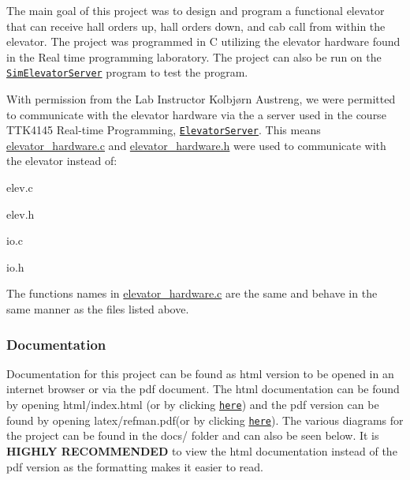 The main goal of this project was to design and program a functional elevator that can receive hall orders up, hall orders down, and cab call from within the elevator. The project was programmed in C utilizing the elevator hardware found in the Real time programming laboratory. The project can also be run on the \href{https://github.com/TTK4145/Simulator-v2}{\tt {\ttfamily Sim\+Elevator\+Server}} program to test the program.

With permission from the Lab Instructor Kolbjørn Austreng, we were permitted to communicate with the elevator hardware via the a server used in the course T\+T\+K4145 Real-\/time Programming, \href{https://github.com/TTK4145/elevator-server}{\tt {\ttfamily Elevator\+Server}}. This means {\ttfamily \hyperlink{elevator__hardware_8c}{elevator\+\_\+hardware.\+c}} and {\ttfamily \hyperlink{elevator__hardware_8h}{elevator\+\_\+hardware.\+h}} were used to communicate with the elevator instead of\+:


\begin{DoxyItemize}
\item {\ttfamily elev.\+c}
\item {\ttfamily elev.\+h}
\item {\ttfamily io.\+c}
\item {\ttfamily io.\+h}
\end{DoxyItemize}

The functions names in {\ttfamily \hyperlink{elevator__hardware_8c}{elevator\+\_\+hardware.\+c}} are the same and behave in the same manner as the files listed above. 



\subsubsection*{Documentation}

Documentation for this project can be found as html version to be opened in an internet browser or via the pdf document. The html documentation can be found by opening {\ttfamily html/index.\+html} (or by clicking \href{html/index.html}{\tt here}) and the {\ttfamily pdf} version can be found by opening {\ttfamily latex/refman.\+pdf}(or by clicking \href{latex/refman.pdf}{\tt here}). The various diagrams for the project can be found in the {\ttfamily docs/} folder and can also be seen below. It is {\bfseries H\+I\+G\+H\+LY R\+E\+C\+O\+M\+M\+E\+N\+D\+ED} to view the {\ttfamily html} documentation instead of the {\ttfamily pdf} version as the formatting makes it easier to read. 




